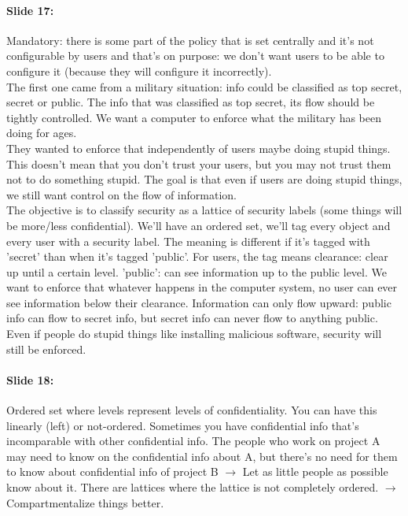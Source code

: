 \documentclass[10pt,a4paper]{report}
\begin{document}
\paragraph{Slide 17:} Mandatory: there is some part of the policy that is set centrally and it's not configurable by users and that's on purpose: we don't want users to be able to configure it (because they will configure it incorrectly).\\
The first one came from a military situation: info could be classified as top secret, secret or public. The info that was classified as top secret, its flow should be tightly controlled. We want a computer to enforce what the military has been doing for ages.\\
They wanted to enforce that independently of users maybe doing stupid things. This doesn't mean that you don't trust your users, but you may not trust them not to do something stupid. The goal is that even if users are doing stupid things, we still want control on the flow of information.\\
The objective is to classify security as a lattice of security labels (some things will be more/less confidential). We'll have an ordered set, we'll tag every object and every user with a security label. The meaning is different if it's tagged with 'secret' than when it's tagged 'public'. For users, the tag means clearance: clear up until a certain level. 'public': can see information up to the public level. We want to enforce that whatever happens in the computer system, no user can ever see information below their clearance. Information can only flow upward: public info can flow to secret info, but secret info can never flow to anything public. Even if people do stupid things like installing malicious software, security will still be enforced.

\paragraph{Slide 18:} Ordered set where levels represent levels of confidentiality. You can have this linearly (left) or not-ordered. Sometimes you have confidential info that's incomparable with other confidential info. The people who work on project A may need to know on the confidential info about A, but there's no need for them to know about confidential info of project B $\rightarrow$ Let as little people as possible know about it. There are lattices where the lattice is not completely ordered. $\rightarrow$ Compartmentalize things better.
\end{document}
